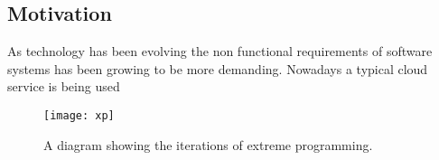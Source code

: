 \documentclass[../main.tex]{subfiles}
\begin{document}
\subsection{Motivation}

As technology has been evolving the non functional requirements of software systems has been growing to be more demanding. Nowadays a typical cloud service is being used 
    
\begin{figure}[ht]
    \centering
        \texttt{[image: xp]}
    \caption{A diagram showing the iterations of extreme programming.}
\end{figure}
    
\blindtext
\end{document}
